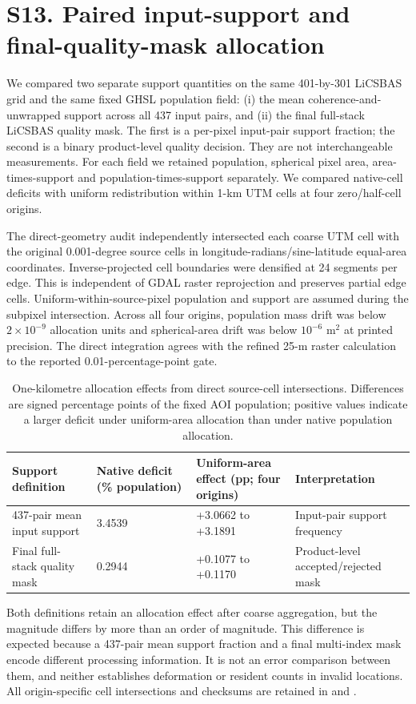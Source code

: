 \section*{S13. Paired input-support and final-quality-mask allocation}
We compared two separate support quantities on the same 401-by-301 LiCSBAS grid and the same fixed GHSL population field: (i) the mean coherence-and-unwrapped support across all 437 input pairs, and (ii) the final full-stack LiCSBAS quality mask. The first is a per-pixel input-pair support fraction; the second is a binary product-level quality decision. They are not interchangeable measurements. For each field we retained population, spherical pixel area, area-times-support and population-times-support separately. We compared native-cell deficits with uniform redistribution within 1-km UTM cells at four zero/half-cell origins.

The direct-geometry audit independently intersected each coarse UTM cell with the original 0.001-degree source cells in longitude-radians/sine-latitude equal-area coordinates. Inverse-projected cell boundaries were densified at 24 segments per edge. This is independent of GDAL raster reprojection and preserves partial edge cells. Uniform-within-source-pixel population and support are assumed during the subpixel intersection. Across all four origins, population mass drift was below $2\times10^{-9}$ allocation units and spherical-area drift was below $10^{-6}$ m$^2$ at printed precision. The direct integration agrees with the refined 25-m raster calculation to the reported 0.01-percentage-point gate.

\begin{table}[htbp]\centering\scriptsize
\caption{One-kilometre allocation effects from direct source-cell intersections. Differences are signed percentage points of the fixed AOI population; positive values indicate a larger deficit under uniform-area allocation than under native population allocation.}
\begin{tabular}{p{2.5cm}p{2.2cm}p{3.8cm}p{4.0cm}}\toprule
Support definition & Native deficit (\% population) & Uniform-area effect (pp; four origins) & Interpretation\\\midrule
437-pair mean input support & 3.4539 & +3.0662 to +3.1891 & Input-pair support frequency\\
Final full-stack quality mask & 0.2944 & +0.1077 to +0.1170 & Product-level accepted/rejected mask\\\bottomrule
\end{tabular}
\end{table}

Both definitions retain an allocation effect after coarse aggregation, but the magnitude differs by more than an order of magnitude. This difference is expected because a 437-pair mean support fraction and a final multi-index mask encode different processing information. It is not an error comparison between them, and neither establishes deformation or resident counts in invalid locations. All origin-specific cell intersections and checksums are retained in  and .
